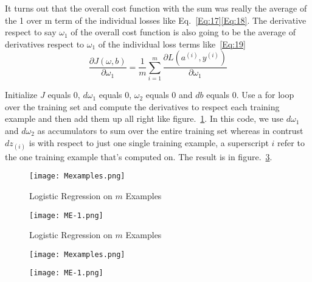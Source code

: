 \documentclass[a4paper]{article}
\begin{document}
It turns out that the overall cost function with the sum was really the average of the 1 over m term of the individual losses like Eq.~\ref{Eq:17}\ref{Eq:18}. The derivative respect to say $\omega_1$ of the overall cost function is also going to be the average of derivatives respect to $\omega_1$ of the individual loss terms like~\ref{Eq:19}
\begin{equation}
\frac{\partial J(\omega,b)}{\partial \omega_1}=\frac{1}{m} \sum_{i=1}^m \frac{\partial L(a^{(i)},y^{(i)})}{\partial \omega_1}
\label{Eq:19}
\end{equation}\par
Initialize $J$ equals 0, $d \omega_1$ equals 0, $\omega_2$ equals 0 and $d b$ equals 0. Use a for loop over the training set and compute the derivatives to respect each training example and then add them up all right like figure.~\ref{fig:ME}. In this code, we use $d \omega_1$ and $d \omega_2$ as accumulators to sum over the entire training set whereas in contrust $d z_{(i)}$ is with respect to just one single training example, a superscript $i$ refer to the one training example that's computed on. The result is in figure.~\ref{fig:ME-1}. 

\begin{figure}[!htp]
\begin{center}
   \texttt{[image: Mexamples.png]}
\end{center}
   \caption{Logistic Regression on $m$ Examples}
\label{fig:ME}
\end{figure}

\begin{figure}[!htp]
\begin{center}
   \texttt{[image: ME-1.png]}
\end{center}
   \caption{Logistic Regression on $m$ Examples}
\label{fig:ME-1}
\end{figure}

\begin{figure}
\begin{minipage}[t]{0.5\linewidth}
\centering
\texttt{[image: Mexamples.png]}
\label{fig:Mexamples}
\end{minipage}%
\begin{minipage}[t]{0.5\linewidth}
\centering
\texttt{[image: ME-1.png]}
\label{fig:ME-1}
\end{minipage}
\end{figure}
\end{document}
